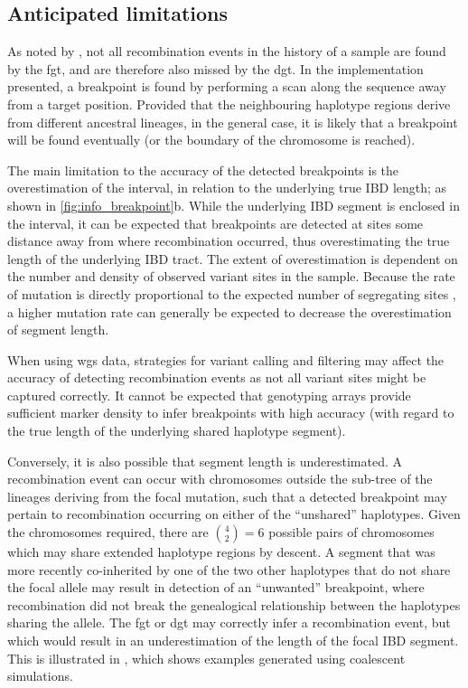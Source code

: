 %
\subsection{Anticipated limitations}\label{sec:ibd_detect_lim}
%

As noted by \citet{Hudson:1985wh}, not all recombination events in the history of a sample are found by the \gls{fgt}, and are therefore also missed by the \gls{dgt}.
In the implementation presented, a breakpoint is found by performing a scan along the sequence away from a target position.
Provided that the neighbouring haplotype regions derive from different ancestral lineages, in the general case, it is likely that a breakpoint will be found eventually (or the boundary of the chromosome is reached).

The main limitation to the accuracy of the detected breakpoints is the overestimation of the interval, in relation to the underlying true IBD length; as shown in \cref{fig:info_breakpoint}{b}.
While the underlying IBD segment is enclosed in the interval, it can be expected that breakpoints are detected at sites some distance away from where recombination occurred, thus overestimating the true length of the underlying IBD tract.
The extent of overestimation is dependent on the number and density of observed variant sites in the sample.
Because the rate of mutation is directly proportional to the expected number of segregating sites \citep{Watterson:1975ur}, a higher mutation rate can generally be expected to decrease the overestimation of segment length.

When using \gls{wgs} data, strategies for variant calling and filtering may affect the accuracy of detecting recombination events as not all variant sites might be captured correctly.
It cannot be expected that genotyping arrays provide sufficient marker density to infer breakpoints with high accuracy (with regard to the true length of the underlying shared haplotype segment).


%

%

Conversely, it is also possible that segment length is underestimated.
A recombination event can occur with chromosomes outside the sub-tree of the lineages deriving from the focal mutation, such that a detected breakpoint may pertain to recombination occurring on either of the ``unshared'' haplotypes.
Given the  chromosomes required, there are ${{{4}\choose{2}}=6}$ possible pairs of chromosomes which may share extended haplotype regions by descent.
A segment that was more recently co-inherited by one of the two other haplotypes that do not share the focal allele may result in detection of an ``unwanted'' breakpoint, where recombination did not break the genealogical relationship between the haplotypes sharing the allele.
The \gls{fgt} or \gls{dgt} may correctly infer a recombination event, but which would result in an underestimation of the length of the focal IBD segment.
This is illustrated in , which shows  examples generated using coalescent simulations.

